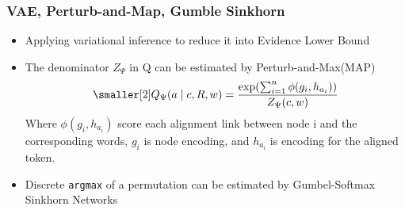 \subsubsection{VAE, Perturb-and-Map, Gumble Sinkhorn}
\label{sssec:lex-phr:gumble-sinkhorn}
\begin{itemize}
\item Applying variational inference to reduce it into
  Evidence Lower Bound~\cite[ELBO,][]{kingma2013auto}
\item The denominator $Z_{\Psi}$ in Q can be estimated by Perturb-and-Max(MAP)~\cite{papandreouperturb}
\begin{equation}
  \label{eq:posterior_prob}
\begin{aligned} \smaller[2]
Q_{\Psi}(a\mid c, R,w)= \frac{\exp(\sum_{i=1}^{n} \phi(g_{i}, h_{a_{i}}))} {Z_{\Psi}(c,w)}
\end{aligned}
\end{equation}
Where $\phi(g_{i}, h_{a_{i}})$ score each alignment link between node i and the corresponding words,
$g_{i}$ is node encoding, and $h_{a_{i}}$ is encoding for the aligned token.

\item Discrete \texttt{argmax} of a permutation can be estimated by
  Gumbel-Softmax Sinkhorn Networks \cite{mena2018learning, lyu2018amr}
\end{itemize}

